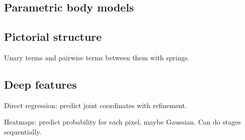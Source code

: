 \documentclass[11pt,landscape,a4paper,fleqn]{article}
\begin{document}
\begin{multicols*}{4}
\section{Parametric body models}

\subsection{Pictorial structure}

Unary terms and pairwise terms between them with springs.

\subsection{Deep features}

Direct regression: predict joint coordinates with refinement.

Heatmaps: predict probability for each pixel, maybe Gaussian.
Can do stages sequentially.

\end{multicols*}
\end{document}

